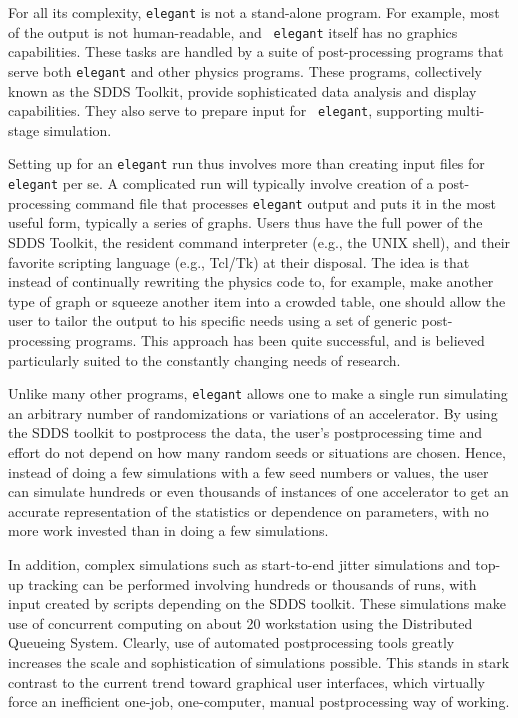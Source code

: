 \documentclass[11pt]{article}
\begin{document}
For all its complexity, {\tt elegant} is not a stand-alone program.
For example, most of the output is not human-readable, and {\tt
elegant} itself has no graphics capabilities.  These tasks are handled
by a suite of post-processing programs that serve both {\tt elegant}
and other physics programs.  These programs, collectively known as the
SDDS Toolkit\cite{SDDS1,SDDS2}, provide sophisticated data analysis
and display capabilities.  They also serve to prepare input for {\tt
elegant}, supporting multi-stage simulation.

Setting up for an {\tt elegant} run thus involves more than creating
input files for {\tt elegant} per se.  A complicated run will
typically involve creation of a post-processing command file that
processes {\tt elegant} output and puts it in the most useful form,
typically a series of graphs.  Users thus have the full power of the
SDDS Toolkit, the resident command interpreter (e.g., the UNIX shell),
and their favorite scripting language (e.g., Tcl/Tk) at their
disposal. The idea is that instead of continually rewriting the
physics code to, for example, make another type of graph or squeeze
another item into a crowded table, one should allow the user to tailor
the output to his specific needs using a set of generic
post-processing programs.  This approach has been quite successful,
and is believed particularly suited to the constantly changing needs
of research.

Unlike many other programs, {\tt elegant} allows one to make a single
run simulating an arbitrary number of randomizations or variations of
an accelerator.  By using the SDDS toolkit to postprocess the data,
the user's postprocessing time and effort do not depend on how many
random seeds or situations are chosen.  Hence, instead of doing a few
simulations with a few seed numbers or values, the user can simulate
hundreds or even thousands of instances of one accelerator to get an
accurate representation of the statistics or dependence on parameters,
with no more work invested than in doing a few simulations.

In addition, complex simulations such as start-to-end jitter
simulations\cite{S2EJitter} and top-up tracking\cite{TopUpTracking}
can be performed involving hundreds or thousands of runs, with input
created by scripts depending on the SDDS toolkit.  These simulations
make use of concurrent computing on about 20 workstation using the
Distributed Queueing System\cite{DQS}.  Clearly, use of automated
postprocessing tools greatly increases the scale and sophistication of
simulations possible.  This stands in stark contrast to the current
trend toward graphical user interfaces, which virtually force an
inefficient one-job, one-computer, manual postprocessing way of
working.
\end{document}
